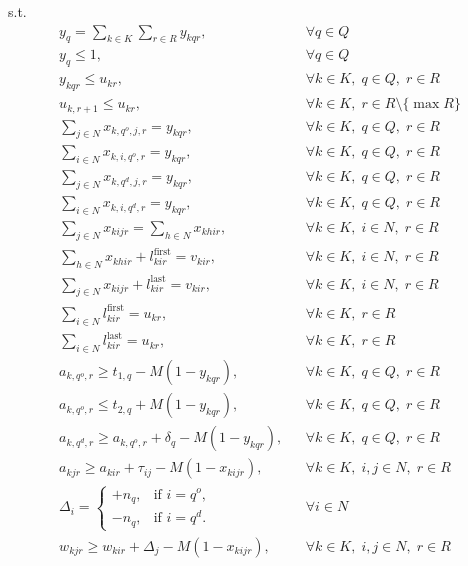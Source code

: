 \documentclass[11pt]{article}
\begin{document}
s.t.
\begin{align}
y_q= \sum_{k\in K}\sum_{r\in R} y_{kqr},
&& \forall q\in Q
\tag{2}\\
y_q\le 1,
&& \forall q\in Q
\tag{3} \\
y_{kqr}\le u_{kr},
&& \forall k\in K,\; q\in Q,\; r\in R
\tag{4}\\
u_{k,r+1}\le u_{kr},
&& \forall k\in K,\; r\in R\setminus\{\max R\}
\tag{5} \\
\sum_{j\in N} x_{k,q^o,j,r}= y_{kqr},
&& \forall k\in K,\; q\in Q,\; r\in R
\tag{6}\\
\sum_{i\in N} x_{k,i,q^o,r}= y_{kqr},
&& \forall k\in K,\; q\in Q,\; r\in R
\tag{7}\\
\sum_{j\in N} x_{k,q^d,j,r}= y_{kqr},
&& \forall k\in K,\; q\in Q,\; r\in R
\tag{8}\\
\sum_{i\in N} x_{k,i,q^d,r}= y_{kqr},
&& \forall k\in K,\; q\in Q,\; r\in R
\tag{9} \\
\sum_{j\in N} x_{kijr}= \sum_{h\in N} x_{khir},
&& \forall k\in K,\; i\in N,\; r\in R
\tag{10} \\
\sum_{h\in N} x_{khir} + l^{\text{first}}_{kir}= v_{kir},
&& \forall k \in K,\; i \in N,\; r \in R
\tag{11} \\
\sum_{j\in N} x_{kijr} + l^{\text{last}}_{kir}= v_{kir},
&& \forall k \in K,\; i \in N,\; r \in R
\tag{12} \\
\sum_{i\in N} l^{\text{first}}_{kir}= u_{kr},
&& \forall k \in K,\; r \in R
\tag{13} \\
\sum_{i\in N} l^{\text{last}}_{kir}= u_{kr},
&& \forall k \in K,\; r \in R
\tag{14} \\
a_{k,q^o,r}\ge t_{1,q} - M(1-y_{kqr}),
&& \forall k\in K,\; q\in Q,\; r\in R
\tag{15} \\
a_{k,q^o,r}\le t_{2,q} + M(1-y_{kqr}),
&& \forall k\in K,\; q\in Q,\; r\in R
\tag{16} \\
a_{k,q^d,r}\ge a_{k,q^o,r} + \delta_q - M(1-y_{kqr}),
&& \forall k\in K,\; q\in Q,\; r\in R
\tag{17} \\
a_{kjr}\ge a_{kir} + \tau_{ij} - M(1-x_{kijr}),
&& \forall k\in K,\; i,j\in N,\; r\in R
\tag{18} \\
\Delta_i=
\begin{cases}
+n_q, & \text{if } i=q^o,\\
-n_q, & \text{if } i=q^d.
\end{cases}
&& \forall i\in N
\tag{19} \\
w_{kjr}\ge w_{kir} + \Delta_j - M(1-x_{kijr}),
&& \forall k\in K,\; i,j\in N,\; r\in R
\tag{20}\\

\end{align}
\end{document}
